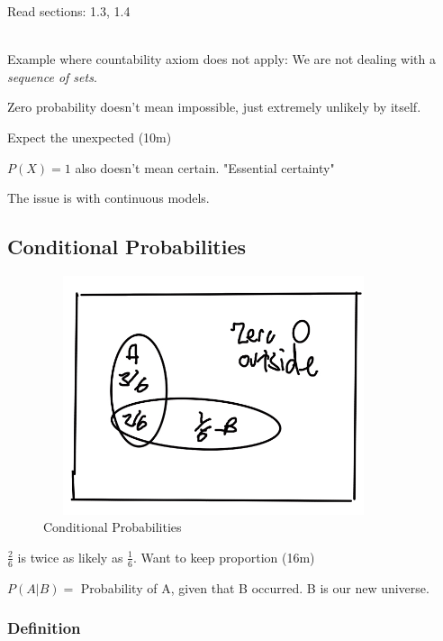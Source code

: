 
 Read sections: 1.3, 1.4\\
\\

Example where countability axiom does not apply: We are not dealing with a \textit{sequence of sets}.

Zero probability doesn't mean impossible, just extremely unlikely by itself.

Expect the unexpected (10m)

$P(X)=1$ also doesn't mean certain.  "Essential certainty"

The issue is with continuous models.

\subsection{Conditional Probabilities}

\begin{figure}[ht]
\centering
\includegraphics[width=10cm, height=7cm]{images/L02/cond_prob.jpeg}
\caption{Conditional Probabilities}
\end{figure}

$\frac{2}{6}$ is twice as likely as $\frac{1}{6}$. Want to keep proportion (16m)

$P(A|B)=$ Probability of A, given that B occurred.  B is our new universe.

\subsubsection{Definition}

